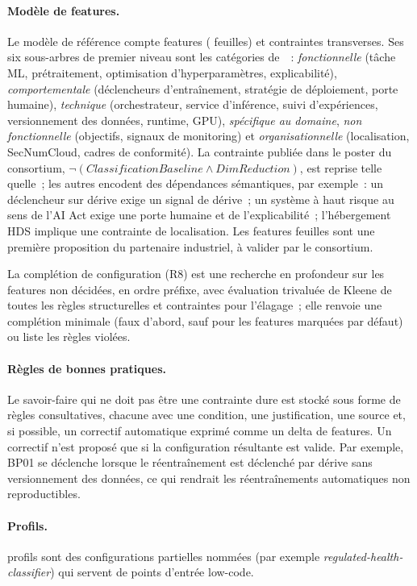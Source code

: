 \documentclass[10pt,a4paper]{article}
\begin{document}
\paragraph{Modèle de features.} Le modèle de référence compte \NFeatures{} features
(\NLeaves{} feuilles) et \NConstraints{} contraintes transverses. Ses six sous-arbres
de premier niveau sont les catégories de~\cite{elhatimi2025}~: \emph{fonctionnelle}
(tâche ML, prétraitement, optimisation d'hyperparamètres, explicabilité),
\emph{comportementale} (déclencheurs d'entraînement, stratégie de déploiement, porte
humaine), \emph{technique} (orchestrateur, service d'inférence, suivi d'expériences,
versionnement des données, runtime, GPU), \emph{spécifique au domaine}, \emph{non
fonctionnelle} (objectifs, signaux de monitoring) et \emph{organisationnelle}
(localisation, SecNumCloud, cadres de conformité). La contrainte publiée dans le
poster du consortium, \(\neg(\textit{ClassificationBaseline} \wedge
\textit{DimReduction})\), est reprise telle quelle~; les autres encodent des
dépendances sémantiques, par exemple~: un déclencheur sur dérive exige un signal de
dérive~; un système à haut risque au sens de l'AI Act exige une porte humaine et de
l'explicabilité~; l'hébergement HDS implique une contrainte de localisation. Les
features feuilles sont une première proposition du partenaire industriel, à valider
par le consortium.

La complétion de configuration (R8) est une recherche en profondeur sur les features
non décidées, en ordre préfixe, avec évaluation trivaluée de Kleene de toutes les
règles structurelles et contraintes pour l'élagage~; elle renvoie une complétion
minimale (faux d'abord, sauf pour les features marquées par défaut) ou liste les
règles violées.

\paragraph{Règles de bonnes pratiques.} Le savoir-faire qui ne doit pas être une
contrainte dure est stocké sous forme de \NRules{} règles consultatives, chacune avec
une condition, une justification, une source et, si possible, un correctif automatique
exprimé comme un delta de features. Un correctif n'est proposé que si la
configuration résultante est valide. Par exemple, BP01 se déclenche lorsque le
réentraînement est déclenché par dérive sans versionnement des données, ce qui
rendrait les réentraînements automatiques non reproductibles.

\paragraph{Profils.} \NProfiles{} profils sont des configurations partielles nommées
(par exemple \emph{regulated-health-classifier}) qui servent de points d'entrée
low-code.
\end{document}
